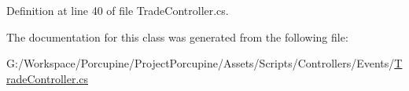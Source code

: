 Definition at line 40 of file Trade\+Controller.\+cs.



The documentation for this class was generated from the following file\+:\begin{DoxyCompactItemize}
\item 
G\+:/\+Workspace/\+Porcupine/\+Project\+Porcupine/\+Assets/\+Scripts/\+Controllers/\+Events/\hyperlink{_trade_controller_8cs}{Trade\+Controller.\+cs}\end{DoxyCompactItemize}
